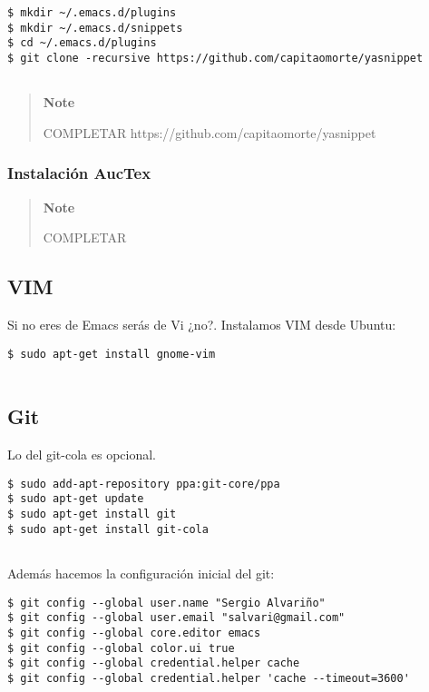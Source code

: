 \begin{verbatim}
$ mkdir ~/.emacs.d/plugins
$ mkdir ~/.emacs.d/snippets
$ cd ~/.emacs.d/plugins
$ git clone -recursive https://github.com/capitaomorte/yasnippet
        
\end{verbatim}

\begin{quote}
\textbf{Note}

COMPLETAR https://github.com/capitaomorte/yasnippet
\end{quote}

\subsubsection{Instalación AucTex}\label{instalaciuxf3n-auctex}

\begin{quote}
\textbf{Note}

COMPLETAR
\end{quote}

\subsection{VIM}\label{vim}

Si no eres de Emacs serás de Vi ¿no?. Instalamos VIM desde Ubuntu:

\begin{verbatim}
$ sudo apt-get install gnome-vim
      
\end{verbatim}

\subsection{Git}\label{git}

Lo del git-cola es opcional.

\begin{verbatim}
$ sudo add-apt-repository ppa:git-core/ppa
$ sudo apt-get update
$ sudo apt-get install git
$ sudo apt-get install git-cola
      
\end{verbatim}

Además hacemos la configuración inicial del git:

\begin{verbatim}
$ git config --global user.name "Sergio Alvariño"
$ git config --global user.email "salvari@gmail.com"
$ git config --global core.editor emacs
$ git config --global color.ui true
$ git config --global credential.helper cache
$ git config --global credential.helper 'cache --timeout=3600'
\end{verbatim}

